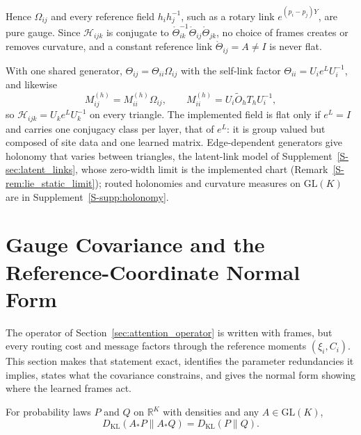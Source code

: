 \documentclass[twoside,11pt]{article}
\begin{document}
Hence $\Omega_{ij}$ and every reference field $h_ih_j^{-1}$, such as a rotary link $e^{(p_i-p_j)Y}$, are pure gauge. Since $\mathcal H_{ijk}$ is conjugate to $\mathring\Theta_{ik}^{-1}\mathring\Theta_{ij}\mathring\Theta_{jk}$, no choice of frames creates or removes curvature, and a constant reference link $\mathring\Theta_{ij}=A\ne I$ is never flat.

With one shared generator, $\Theta_{ij}=\Theta_{ii}\Omega_{ij}$ with the self-link factor $\Theta_{ii}=U_ie^{L}U_i^{-1}$, and likewise
\begin{equation}
M_{ij}^{(h)}=M_{ii}^{(h)}\Omega_{ij},\qquad
M_{ii}^{(h)}=U_i\widetilde O_hT_hU_i^{-1},
\label{eq:main_processing_transport}
\end{equation}
so $\mathcal H_{ijk}=U_ke^{L}U_k^{-1}$ on every triangle. The implemented field is flat only if $e^{L}=I$ and carries one conjugacy class per layer, that of $e^{L}$: it is group valued but composed of site data and one learned matrix. Edge-dependent generators give holonomy that varies between triangles, the latent-link model of Supplement~\ref{S-sec:latent_links}, whose zero-width limit is the implemented chart (Remark~\ref{S-rem:lie_static_limit}); routed holonomies and curvature measures on $\mathrm{GL}(K)$ are in Supplement~\ref{S-supp:holonomy}.


\section{Gauge Covariance and the Reference-Coordinate Normal Form}
\label{sec:passive_covariance}

The operator of Section~\ref{sec:attention_operator} is written with frames, but every routing cost and message factors through the reference moments $(\xi_i,C_i)$. This section makes that statement exact, identifies the parameter redundancies it implies, states what the covariance constrains, and gives the normal form showing where the learned frames act.

\begin{lemma}
\label{lem:glk_invariance}
For probability laws $P$ and $Q$ on $\mathbb R^K$ with densities and any $A\in\mathrm{GL}(K)$,
\begin{equation}
D_{\mathrm{KL}}(A_*P\|A_*Q)=D_{\mathrm{KL}}(P\|Q).
\label{eq:glk_invariance}
\end{equation}
\end{lemma}
\end{document}
